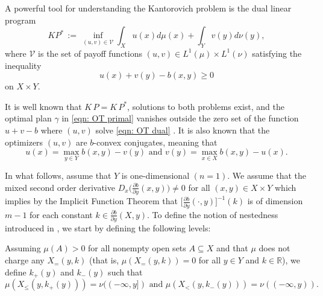 \documentclass[12pt,reqno]{amsart}
\newtheorem{definition}{Definition}
\begin{document}
A powerful tool for understanding the Kantorovich problem is the dual linear program
\begin{equation}\label{eqn: OT dual}\tag{DP}
KP^*\,:=\, \inf_{(u,v)\in \mathcal{V}}\int_X u(x)d\mu(x)+\int_Y v(y)d\nu(y),
\end{equation}
where $\mathcal{V}$ is the set of payoff functions $(u,v)\in L^1(\mu)\times L^1(\nu)$ satisfying the inequality
\[u(x)+v(y)-b(x,y)\ge0\] on $X\times Y.$ %

It is well known that   $K\,P=K\,P^*$, solutions to both problems exist, and the optimal plan $\gamma$ in \eqref{eqn: OT primal} vanishes outside the zero set of the function $u+v-b$ where $(u,v)$ solve \eqref{eqn: OT dual} \cite{Santambrogio}. It is also known that the optimizers $(u,v)$ are $b$-convex conjugates, %
meaning that \[u(x)=\max_{y\in Y}b(x,y)-v(y)\text{ and }
v(y)=\max_{x\in X}b(x,y)-u(x).\]



In what follows, assume that $Y$ is one-dimensional $(n=1)$. We assume that the mixed second order derivative $D_x\Big(\frac{\partial b}{\partial y}(x,y)\Big)\neq 0$ for all $(x,y)\in X\times Y$ which implies by the Implicit Function Theorem that $\Big[\frac{\partial b}{\partial y}(\cdot,y)\Big]^{-1}(k)$ is of dimension $m-1$ for each constant $k \in \frac{\partial b}{\partial y}(X,y).$ To define the notion of nestedness introduced in \cite{ChiapporiMcCannPass17}, we start by  defining the following levels:

Assuming $\mu(A)>0$ for all nonempty open sets $A\subseteq X$ and that $\mu$ does not charge any $X_=(y,k)$ (that is, $\mu(X_=(y,k))=0$ for all $y \in Y$ and $k \in \mathbb{R}$), we define $k_+(y)$ and $k_-(y)$ such that 
\[\mu(X_{\le}(y,k_+(y)))=\nu((-\infty,y]) \text{ and } \mu(X_{<}(y,k_-(y)))=\nu((-\infty,y)).\]
\end{document}
